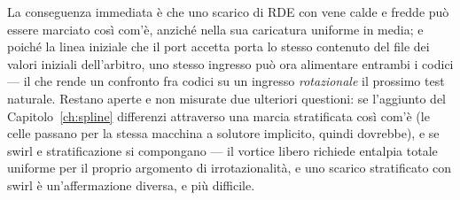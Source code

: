 La conseguenza immediata è che uno scarico di RDE con vene calde e
fredde può essere marciato così com'è, anziché nella sua caricatura
uniforme in media; e poiché la linea iniziale che il port accetta
porta lo stesso contenuto del file dei valori iniziali dell'arbitro,
uno stesso ingresso può ora alimentare entrambi i codici --- il che
rende un confronto fra codici su un ingresso \emph{rotazionale} il
prossimo test naturale. Restano aperte e non misurate due ulteriori
questioni: se l'aggiunto del Capitolo~\ref{ch:spline} differenzi
attraverso una marcia stratificata così com'è (le celle passano per
la stessa macchina a solutore implicito, quindi dovrebbe), e se swirl
e stratificazione si compongano --- il vortice libero richiede
entalpia totale uniforme per il proprio argomento di
irrotazionalità, e uno scarico stratificato con swirl è
un'affermazione diversa, e più difficile.
